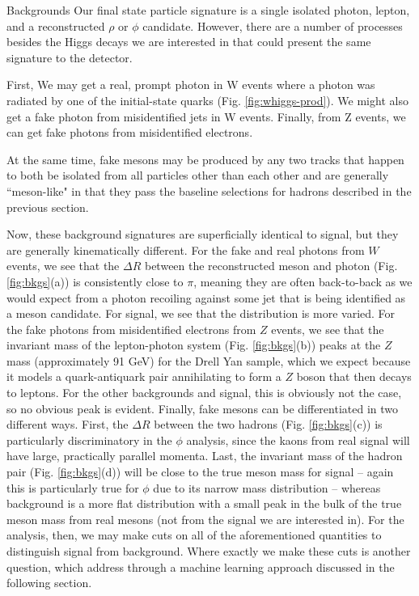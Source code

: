 \begin{section}{Backgrounds}\label{backgrounds}
Our final state particle signature is a single isolated photon, lepton, and a reconstructed $\rho$ or $\phi$ candidate. However, there are a number of processes besides the Higgs decays we are interested in that could present the same signature to the detector.

First, We may get a real, prompt photon in W events where a photon was radiated by one of the initial-state quarks (Fig. \ref{fig:whiggs-prod}). We might also get a fake photon from misidentified jets in W events. Finally, from Z events, we can get fake photons from misidentified electrons.

At the same time, fake mesons may be produced by any two tracks that happen to both be isolated from all particles other than each other and are generally ``meson-like" in that they pass the baseline selections for hadrons described in the previous section.

Now, these background signatures are superficially identical to signal, but they are generally kinematically different. For the fake and real photons from $W$ events, we see that the $\Delta R$ between the reconstructed meson and photon (Fig. \ref{fig:bkgs}(a)) is consistently close to $\pi$, meaning they are often back-to-back as we would expect from a photon recoiling against some jet that is being identified as a meson candidate. For signal, we see that the distribution is more varied. For the fake photons from misidentified electrons from $Z$ events, we see that the invariant mass of the lepton-photon system (Fig. \ref{fig:bkgs}(b)) peaks at the $Z$ mass (approximately 91 GeV\cite{cite-Z-mass}) for the Drell Yan sample, which we expect because it models a quark-antiquark pair annihilating to form a $Z$ boson that then decays to leptons. For the other backgrounds and signal, this is obviously not the case, so no obvious peak is evident. Finally, fake mesons can be differentiated in two different ways. First, the $\Delta R$ between the two hadrons (Fig. \ref{fig:bkgs}(c)) is particularly discriminatory in the $\phi$ analysis, since the kaons from real signal will have large, practically parallel momenta. Last, the invariant mass of the hadron pair (Fig. \ref{fig:bkgs}(d)) will be close to the true meson mass for signal -- again this is particularly true for $\phi$ due to its narrow mass distribution -- whereas background is a more flat distribution with a small peak in the bulk of the true meson mass from real mesons (not from the signal we are interested in). For the analysis, then, we may make cuts on all of the aforementioned quantities to distinguish signal from background. Where exactly we make these cuts is another question, which address through a machine learning approach discussed in the following section.


\end{section}
